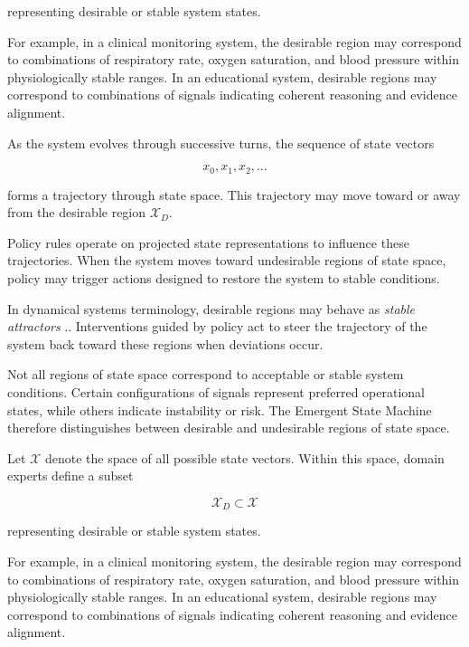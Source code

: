 \documentclass[11pt]{article}
\begin{document}
representing desirable or stable system states.

For example, in a clinical monitoring system, the desirable region may correspond to combinations of respiratory rate, oxygen saturation, and blood pressure within physiologically stable ranges. In an educational system, desirable regions may correspond to combinations of signals indicating coherent reasoning and evidence alignment.

As the system evolves through successive turns, the sequence of state vectors

\begin{equation}
x_0, x_1, x_2, \dots
\end{equation}

forms a trajectory through state space. This trajectory may move toward or away from the desirable region $\mathcal{X}_D$.

Policy rules operate on projected state representations to influence these trajectories. When the system moves toward undesirable regions of state space, policy may trigger actions designed to restore the system to stable conditions.

In dynamical systems terminology, desirable regions may behave as \emph{stable attractors} \citep{strogatz2015}.. Interventions guided by policy act to steer the trajectory of the system back toward these regions when deviations occur.

Not all regions of state space correspond to acceptable or stable system conditions. Certain configurations of signals represent preferred operational states, while others indicate instability or risk. The Emergent State Machine therefore distinguishes between desirable and undesirable regions of state space.

Let $\mathcal{X}$ denote the space of all possible state vectors. Within this space, domain experts define a subset

\begin{equation}
\mathcal{X}_D \subset \mathcal{X}
\end{equation}

representing desirable or stable system states.

For example, in a clinical monitoring system, the desirable region may correspond to combinations of respiratory rate, oxygen saturation, and blood pressure within physiologically stable ranges. In an educational system, desirable regions may correspond to combinations of signals indicating coherent reasoning and evidence alignment.
\end{document}
